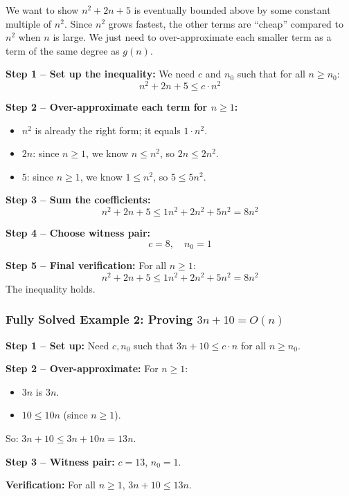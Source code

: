 \documentclass[12pt,portrait]{article}
\begin{document}
\begin{rulebox}
We want to show $n^2 + 2n + 5$ is eventually bounded above by some constant multiple of $n^2$. Since $n^2$ grows fastest, the other terms are ``cheap'' compared to $n^2$ when $n$ is large. We just need to over-approximate each smaller term as a term of the same degree as $g(n)$.

\textbf{Step 1 -- Set up the inequality:}
We need $c$ and $n_0$ such that for all $n \geq n_0$:
$$n^2 + 2n + 5 \leq c \cdot n^2$$

\textbf{Step 2 -- Over-approximate each term for $n \geq 1$:}
\begin{itemize}[leftmargin=*]
    \item $n^2$ is already the right form; it equals $1\cdot n^2$.
    \item $2n$: since $n \geq 1$, we know $n \leq n^2$, so $2n \leq 2n^2$.
    \item $5$: since $n \geq 1$, we know $1 \leq n^2$, so $5 \leq 5n^2$.
\end{itemize}

\textbf{Step 3 -- Sum the coefficients:}
$$n^2 + 2n + 5 \leq 1n^2 + 2n^2 + 5n^2 = 8n^2$$

\textbf{Step 4 -- Choose witness pair:}
$$c = 8, \quad n_0 = 1$$

\textbf{Step 5 -- Final verification:}
For all $n \geq 1$:
$$n^2 + 2n + 5 \leq 1n^2 + 2n^2 + 5n^2 = 8n^2$$
The inequality holds.
\end{rulebox}

\subsubsection{Fully Solved Example 2: Proving $3n + 10 = O(n)$}

\begin{rulebox}
\textbf{Step 1 -- Set up:} Need $c, n_0$ such that $3n + 10 \leq c \cdot n$ for all $n \geq n_0$.

\textbf{Step 2 -- Over-approximate:} For $n \geq 1$:
\begin{itemize}[leftmargin=*]
    \item $3n$ is $3n$.
    \item $10 \leq 10n$ (since $n \geq 1$).
\end{itemize}
So: $3n + 10 \leq 3n + 10n = 13n$.

\textbf{Step 3 -- Witness pair:} $c = 13$, $n_0 = 1$.

\textbf{Verification:} For all $n \geq 1$, $3n + 10 \leq 13n$.
\end{rulebox}
\end{document}
